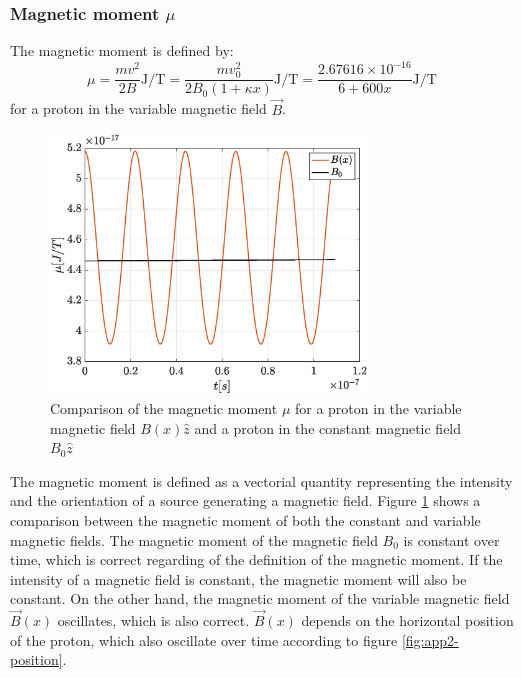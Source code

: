 \documentclass[a4paper,12pt,twoside]{article}
\begin{document}
\subsubsection{Magnetic moment $\mu$} %

The magnetic moment is defined by:
\begin{equation}
\mu = \frac{mv^2}{2B} \si{\joule \per \tesla} = \frac{mv_0^2}{2B_0(1+\kappa x)} \si{\joule \per \tesla} = \frac{2.67616 \times 10^{-16}}{6+600x} \si{\joule \per \tesla}
\end{equation}
for a proton in the variable magnetic field $\vec{B}$.

\begin{figure}[h]
\centering
	\includegraphics[width=0.75\textwidth]{graphs/mu.eps}
	\caption{Comparison of the magnetic moment $\mu$ for a proton in the variable magnetic field $B(x)\hat{z}$ and a proton in the constant magnetic field $B_0\hat{z}$}
	\label{fig:mu}
\end{figure}

The magnetic moment is defined as a vectorial quantity representing the intensity and the orientation of a source generating a magnetic field.\cite{wiki:magnetic-moment}
Figure \ref{fig:mu} shows a comparison between the magnetic moment of both the constant and variable magnetic fields.
The magnetic moment of the magnetic field $B_0$ is constant over time, which is correct regarding of the definition of the magnetic moment.
If the intensity of a magnetic field is constant, the magnetic moment will also be constant.
On the other hand, the magnetic moment of the variable magnetic field $\vec{B}(x)$ oscillates, which is also correct.
$\vec{B}(x)$ depends on the horizontal position of the proton, which also oscillate over time according to figure \ref{fig:app2-position}. %
\end{document}
